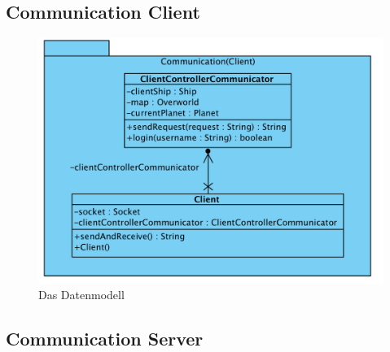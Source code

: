 \documentclass[fontsize=12pt,paper=a4,twoside]{scrartcl}
\begin{document}
\subsection{Communication Client}
\begin{figure}[H]
\begin{center}
  \includegraphics[width=\linewidth]{../GT_Modulsicht/src/CommClient.png}
    \caption{Das Datenmodell}
\end{center}
\end{figure}

\subsection{Communication Server}
\end{document}
